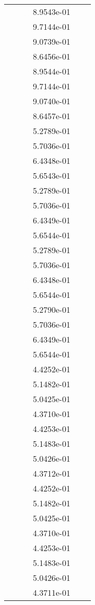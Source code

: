\begin{xltabular}{\textwidth}{r|rS[table-format=1.3e+2]S[table-format=1.4e+2]S[table-format=1.4e+2]S[table-format=-1.5]}
&  &  & 8.9543e-01 & & \\
&  &  & 9.7144e-01 & & \\
&  &  & 9.0739e-01 & & \\
&  &  & 8.6456e-01 & & \\
&  &  & 8.9544e-01 & & \\
&  &  & 9.7144e-01 & & \\
&  &  & 9.0740e-01 & & \\
&  &  & 8.6457e-01 & & \\
&  &  & 5.2789e-01 & & \\
&  &  & 5.7036e-01 & & \\
&  &  & 6.4348e-01 & & \\
&  &  & 5.6543e-01 & & \\
&  &  & 5.2789e-01 & & \\
&  &  & 5.7036e-01 & & \\
&  &  & 6.4349e-01 & & \\
&  &  & 5.6544e-01 & & \\
&  &  & 5.2789e-01 & & \\
&  &  & 5.7036e-01 & & \\
&  &  & 6.4348e-01 & & \\
&  &  & 5.6544e-01 & & \\
&  &  & 5.2790e-01 & & \\
&  &  & 5.7036e-01 & & \\
&  &  & 6.4349e-01 & & \\
&  &  & 5.6544e-01 & & \\
&  &  & 4.4252e-01 & & \\
&  &  & 5.1482e-01 & & \\
&  &  & 5.0425e-01 & & \\
&  &  & 4.3710e-01 & & \\
&  &  & 4.4253e-01 & & \\
&  &  & 5.1483e-01 & & \\
&  &  & 5.0426e-01 & & \\
&  &  & 4.3712e-01 & & \\
&  &  & 4.4252e-01 & & \\
&  &  & 5.1482e-01 & & \\
&  &  & 5.0425e-01 & & \\
&  &  & 4.3710e-01 & & \\
&  &  & 4.4253e-01 & & \\
&  &  & 5.1483e-01 & & \\
&  &  & 5.0426e-01 & & \\
&  &  & 4.3711e-01 & & \\

\end{xltabular}
